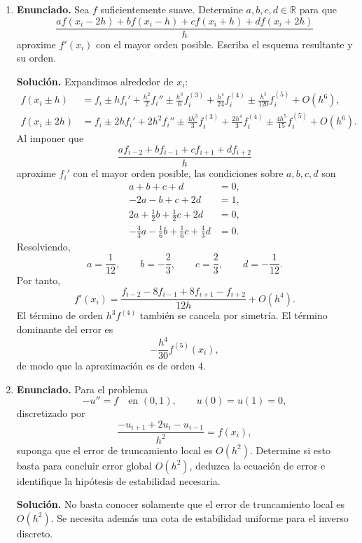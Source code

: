 \documentclass[11pt]{article}
\def\R{\mathbb R}
\begin{document}
\begin{enumerate}[label=\textbf{\arabic*.}, leftmargin=*]

    \item \textbf{Enunciado.} Sea $f$ suficientemente suave. Determine $a,b,c,d\in\R$ para que
    \[
        \frac{a f(x_i-2h)+b f(x_i-h)+c f(x_i+h)+d f(x_i+2h)}{h}
    \]
    aproxime $f'(x_i)$ con el mayor orden posible. Escriba el esquema resultante y su orden.

    \textbf{Solución.} Expandimos alrededor de $x_i$:
    \begin{align*}
        f(x_i\pm h)
        &=f_i\pm h f_i'+\frac{h^2}{2}f_i''\pm\frac{h^3}{6}f_i^{(3)}
        +\frac{h^4}{24}f_i^{(4)}\pm\frac{h^5}{120}f_i^{(5)}+O(h^6),\\
        f(x_i\pm 2h)
        &=f_i\pm2h f_i'+2h^2f_i''\pm\frac{4h^3}{3}f_i^{(3)}
        +\frac{2h^4}{3}f_i^{(4)}\pm\frac{4h^5}{15}f_i^{(5)}+O(h^6).
    \end{align*}
    Al imponer que
    \[
        \frac{a f_{i-2}+b f_{i-1}+c f_{i+1}+d f_{i+2}}{h}
    \]
    aproxime $f_i'$ con el mayor orden posible, las condiciones sobre $a,b,c,d$ son
    \[
    \begin{aligned}
        a+b+c+d&=0,\\
        -2a-b+c+2d&=1,\\
        2a+\frac12b+\frac12c+2d&=0,\\
        -\frac43a-\frac16b+\frac16c+\frac43d&=0.
    \end{aligned}
    \]
    Resolviendo,
    \[
        a=\frac1{12},\qquad b=-\frac23,\qquad c=\frac23,\qquad d=-\frac1{12}.
    \]
    Por tanto,
    \[
        f'(x_i)
        =
        \frac{f_{i-2}-8f_{i-1}+8f_{i+1}-f_{i+2}}{12h}
        +O(h^4).
    \]
    El término de orden $h^3f^{(4)}$ también se cancela por simetría. El término dominante del error es
    \[
        -\frac{h^4}{30}f^{(5)}(x_i),
    \]
    de modo que la aproximación es de orden $4$.

    \item \textbf{Enunciado.} Para el problema
    \[
        -u''=f\quad\text{en }(0,1),\qquad u(0)=u(1)=0,
    \]
    discretizado por
    \[
        \frac{-u_{i+1}+2u_i-u_{i-1}}{h^2}=f(x_i),
    \]
    suponga que el error de truncamiento local es $O(h^2)$. Determine si esto basta para concluir error global $O(h^2)$, deduzca la ecuación de error e identifique la hipótesis de estabilidad necesaria.

    \textbf{Solución.} No basta conocer solamente que el error de truncamiento local es $O(h^2)$. Se necesita además una cota de estabilidad uniforme para el inverso discreto.


\end{enumerate}
\end{document}

